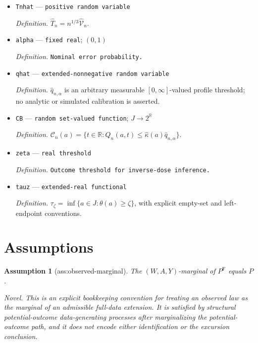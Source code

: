 \documentclass{article}
\newtheorem{assumption}{Assumption}
\begin{document}
\begin{itemize}
  \item \texttt{Tnhat} --- \texttt{positive random variable}
  \par\smallskip\noindent\emph{Definition.} \(\widehat T_n=n^{1/3}\widehat{\mathcal V}_n\).
  \item \texttt{alpha} --- \texttt{fixed real}; \((0,1)\)
  \par\smallskip\noindent\emph{Definition.} \texttt{Nominal error probability.}
  \item \texttt{qhat} --- \texttt{extended-\allowbreak{}nonnegative random variable}
  \par\smallskip\noindent\emph{Definition.} \(\widehat q_{n,\alpha}\) is an arbitrary measurable \([0,\infty]\)-valued profile threshold; no analytic or simulated calibration is asserted.
  \item \texttt{CB} --- \texttt{random set-\allowbreak{}valued function}; \(J\to2^{\mathbb R}\)
  \par\smallskip\noindent\emph{Definition.} \(\mathcal C_n(a)=\{t\in\mathbb R:Q_n(a,t)\le\widehat\kappa(a)\widehat q_{n,\alpha}\}\).
  \item \texttt{zeta} --- \texttt{real threshold}
  \par\smallskip\noindent\emph{Definition.} \texttt{Outcome threshold for inverse-\allowbreak{}dose inference.}
  \item \texttt{tauz} --- \texttt{extended-\allowbreak{}real functional}
  \par\smallskip\noindent\emph{Definition.} \(\tau_{\zeta}=\inf\{a\in J:\theta(a)\ge\zeta\}\), with explicit empty-set and left-endpoint conventions.
\end{itemize}

\section{Assumptions}

\begin{assumption}[ass:observed-marginal]\label{ass:observed-marginal}
The \((W,A,Y)\)-marginal of \(P^{\mathrm F}\) equals \(P\).
\par\smallskip\noindent\emph{Novel.} This is an explicit bookkeeping convention for treating an observed law as the marginal of an admissible full-data extension. It is satisfied by structural potential-outcome data-generating processes after marginalizing the potential-outcome path, and it does not encode either identification or the excursion conclusion.
\end{assumption}
\end{document}
